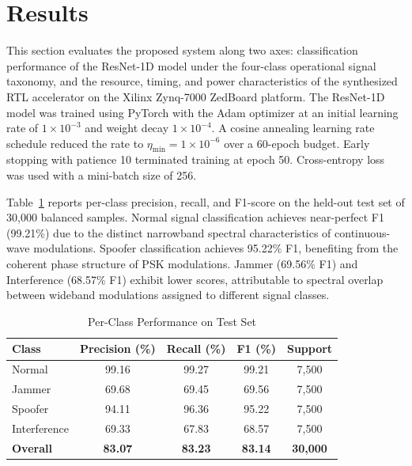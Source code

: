 \documentclass[conference]{IEEEtran}
\begin{document}
\section{Results}
This section evaluates the proposed system along two axes: classification performance of the ResNet-1D model under the four-class operational signal taxonomy, and the resource, timing, and power characteristics of the synthesized RTL accelerator on the Xilinx Zynq-7000 ZedBoard platform.
The ResNet-1D model was trained using PyTorch with the Adam optimizer \cite{b19} at an initial learning rate of $1 \times 10^{-3}$ and weight decay $1 \times 10^{-4}$. A cosine annealing learning rate schedule reduced the rate to $\eta_{\min} = 1 \times 10^{-6}$ over a 60-epoch budget. Early stopping with patience 10 terminated training at epoch 50. Cross-entropy loss was used with a mini-batch size of 256.

Table~\ref{tab:perclass} reports per-class precision, recall, and F1-score on the held-out test set of 30,000 balanced samples. Normal signal classification achieves near-perfect F1 (99.21\%) due to the distinct narrowband spectral characteristics of continuous-wave modulations. Spoofer classification achieves 95.22\% F1, benefiting from the coherent phase structure of PSK modulations. Jammer (69.56\% F1) and Interference (68.57\% F1) exhibit lower scores, attributable to spectral overlap between wideband modulations assigned to different signal classes.
\begin{table}[t]
\renewcommand{\arraystretch}{1.3}
\caption{Per-Class Performance on Test Set}
\begin{center}
\begin{tabular}{lcccc}
\toprule
\textbf{Class} & \textbf{Precision (\%)} & \textbf{Recall (\%)} & \textbf{F1 (\%)} & \textbf{Support} \\
\midrule
Normal      & 99.16 & 99.27 & 99.21 & 7,500 \\
Jammer      & 69.68 & 69.45 & 69.56 & 7,500 \\
Spoofer     & 94.11 & 96.36 & 95.22 & 7,500 \\
Interference& 69.33 & 67.83 & 68.57 & 7,500 \\
\midrule
\textbf{Overall} & \textbf{83.07} & \textbf{83.23} & \textbf{83.14} & \textbf{30,000} \\
\bottomrule
\end{tabular}
\label{tab:perclass}
\end{center}
\end{table}
\end{document}
